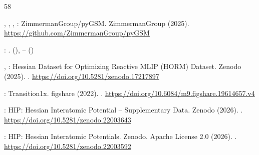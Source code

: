 \documentclass[pdflatex,sn-mathphys-num]{sn-jnl}%
\begin{document}
\begin{thebibliography}{58}
\begin{botherref}
,
,
,
:
{{ZimmermanGroup}}/{{pyGSM}}.
ZimmermanGroup
(2025).
\url{https://github.com/ZimmermanGroup/pyGSM}
\end{botherref}
\endbibitem

\begin{barticle}
:
.
(),
--
()
\end{barticle}
\endbibitem

\begin{botherref}
,
:
Hessian Dataset for Optimizing Reactive {MLIP} ({HORM}) Dataset.
Zenodo
(2025).
 .
\url{https://doi.org/10.5281/zenodo.17217897}
\end{botherref}
\endbibitem

\begin{botherref}
:
{Transition1x}.
figshare
(2022).
 .
\url{https://doi.org/10.6084/m9.figshare.19614657.v4}
\end{botherref}
\endbibitem

\begin{botherref}
:
{HIP}: Hessian Interatomic Potential -- Supplementary Data.
Zenodo
(2026).
 .
\url{https://doi.org/10.5281/zenodo.22003643}
\end{botherref}
\endbibitem

\begin{botherref}
:
{HIP}: Hessian Interatomic Potentials.
Zenodo.
Apache License 2.0
(2026).
 .
\url{https://doi.org/10.5281/zenodo.22003592}
\end{botherref}
\endbibitem

\end{thebibliography}
\end{document}
